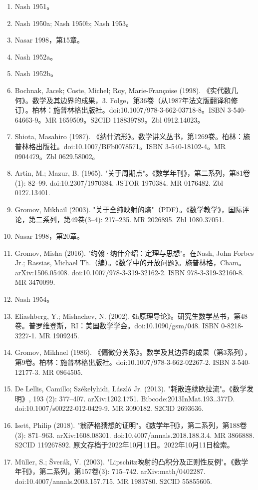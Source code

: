 \begin{enumerate}
\item Nash 1951。
\item Nash 1950a; Nash 1950b; Nash 1953。
\item Nasar 1998，第15章。
\item Nash 1952a。
\item Nash 1952b。
\item Bochnak, Jacek; Coste, Michel; Roy, Marie-Françoise (1998). 《实代数几何》。数学及其边界的成果，3. Folge，第36卷（从1987年法文版翻译和修订）。柏林：施普林格出版社。doi:10.1007/978-3-662-03718-8。ISBN 3-540-64663-9。MR 1659509。S2CID 118839789。Zbl 0912.14023。
\item Shiota, Masahiro (1987). 《纳什流形》。数学讲义丛书，第1269卷。柏林：施普林格出版社。doi:10.1007/BFb0078571。ISBN 3-540-18102-4。MR 0904479。Zbl 0629.58002。
\item Artin, M.; Mazur, B. (1965). "关于周期点"。《数学年刊》，第二系列，第81卷(1): 82–99. doi:10.2307/1970384. JSTOR 1970384. MR 0176482. Zbl 0127.13401.
\item Gromov, Mikhaïl (2003). "关于全纯映射的熵"（PDF）。《数学教学》，国际评论，第二系列，第49卷(3–4): 217–235. MR 2026895. Zbl 1080.37051.
\item Nasar 1998，第20章。
\item Gromov, Misha (2016). "约翰·纳什介绍：定理与思想"。在Nash, John Forbes Jr.; Rassias, Michael Th.（编）。《数学中的开放问题》。施普林格，Cham。arXiv:1506.05408. doi:10.1007/978-3-319-32162-2. ISBN 978-3-319-32160-8. MR 3470099.
\item Nash 1954。
\item Eliashberg, Y.; Mishachev, N. (2002). 《h原理导论》。研究生数学丛书，第48卷。普罗维登斯，RI：美国数学学会。doi:10.1090/gsm/048. ISBN 0-8218-3227-1. MR 1909245.
\item Gromov, Mikhael (1986). 《偏微分关系》。数学及其边界的成果（第3系列），第9卷。柏林：施普林格出版社。doi:10.1007/978-3-662-02267-2. ISBN 3-540-12177-3. MR 0864505.
\item De Lellis, Camillo; Székelyhidi, László Jr. (2013). "耗散连续欧拉流"。《数学发明》, 193 (2): 377–407. arXiv:1202.1751. Bibcode:2013InMat.193..377D. doi:10.1007/s00222-012-0429-9. MR 3090182. S2CID 2693636.
\item Isett, Philip (2018). "翁萨格猜想的证明"。《数学年刊》，第二系列，第188卷(3): 871–963. arXiv:1608.08301. doi:10.4007/annals.2018.188.3.4. MR 3866888. S2CID 119267892. 原文存档于2022年10月11日。2022年10月11日检索。
\item Müller, S.; Šverák, V. (2003). "Lipschitz映射的凸积分及正则性反例"。《数学年刊》，第二系列，第157卷(3): 715–742. arXiv:math/0402287. doi:10.4007/annals.2003.157.715. MR 1983780. S2CID 55855605.

\end{enumerate}
